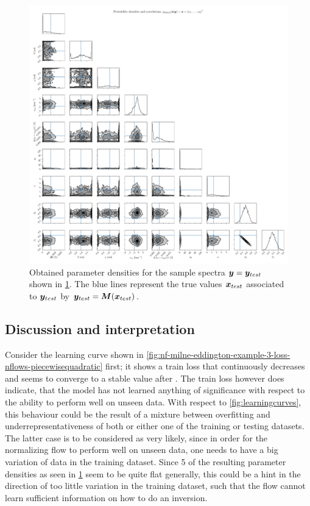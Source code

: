 \documentclass[a4paper,12pt]{report}
\def\lk#1{{\color{black}{#1}}}
\begin{document}
\begin{figure}[h!]
\centering
\includegraphics[width=\textwidth]{figures/nf-milne-eddington-example-3-corner-nflows-piecewisequadratic.pdf}
\caption{Obtained parameter densities for the sample spectra $\bm{y} = \bm{y}_{test}$ shown in \cref{fig:nf-milne-eddington-example-3-corner-nflows-piecewisequadratic}. The blue lines represent the true values $\bm{x}_{test}$ associated to $\bm{y}_{test}$ by $\bm{y}_{test} = \bm{M}(\bm{x}_{test})$.}
\label{fig:nf-milne-eddington-example-3-corner-nflows-piecewisequadratic}
\end{figure}


\subsection{Discussion and interpretation}
Consider the learning curve shown in \cref{fig:nf-milne-eddington-example-3-loss-nflows-piecewisequadratic} first; it shows a train loss that continuously decreases and seems to converge to a stable value after \lk{around six epochs}. The train loss however does indicate, that the model has not learned anything of significance with respect to the ability to perform well on unseen data. With respect to \cref{fig:learningcurves}, this behaviour could be the result of a mixture between overfitting and underrepresentativeness of both or either one of the training or testing datasets. The latter case is to be considered as very likely, since in order for the normalizing flow to perform well on unseen data, one needs to have a big variation of data in the training dataset. Since 5 of the resulting parameter densities as seen in \cref{fig:nf-milne-eddington-example-3-corner-nflows-piecewisequadratic} seem to be quite flat generally, this could be a hint in the direction of too little variation in the training dataset, such that the flow cannot learn sufficient information on how to do an inversion.
\end{document}

